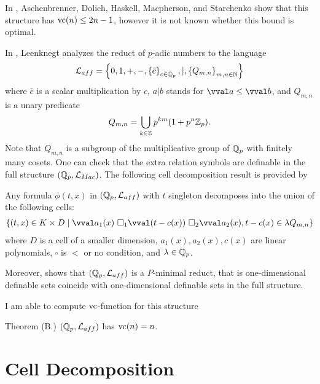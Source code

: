 \documentclass{amsart}
\renewcommand{\LL}{\mathcal L}
\newcommand{\LLM}{\mathcal L_{Mac}}
\newcommand{\curly}[1]{\left\{#1\right\}}
\begin{document}
In \cite{density}, Aschenbrenner, Dolich, Haskell, Macpherson, and Starchenko show that this structure has $\operatorname{vc}(n) \leq 2n - 1$,
however it is not known whether this bound is optimal.

In \cite{reduct}, Leenknegt analyzes the reduct of $p$-adic numbers to the language
\begin{align*}
    \LL_{aff}  = \curly{0, 1, +, -, \curly{\bar c}_{c \in \Q_p}, |, \curly{Q_{m,n}}_{m,n\in \N}}
\end{align*}
where $\bar c$ is a scalar multiplication by $c$,
$a | b$ stands for $\vval a \leq \vval b$,
and $Q_{m,n}$ is a unary predicate
\begin{align*}
    Q_{m,n} = \bigcup_{k \in \mathbb{Z}} p^{km} (1 + p^n\mathbb{Z}_p).
\end{align*}
Note that $Q_{m,n}$ is a subgroup of the multiplicative group of $\mathbb{Q}_p$ with finitely many cosets.
One can check that the extra relation symbols are definable in the full structure $(\Q_p, \LLM)$.
The following cell decomposition result is provided by \cite{reduct}

\begin{Theorem}
    Any formula $\phi(t, x)$ in $(\Q_p, \LL_{aff})$ with $t$ singleton decomposes into the union of the following cells:
    \begin{align*}
            \curly{(t, x) \in K \times D \mid \vval a_1(x) \ \square_1 \vval (t - c(x)) \ \square_2 \vval a_2(x), t - c(x) \in \lambda Q_{m,n} }
    \end{align*}
    where $D$ is a cell of a smaller dimension,
    $a_1(x), a_2(x), c(x)$ are linear polynomials,
    $\square$ is $<$ or no condition, and
    $\lambda  \in\mathbb{Q}_p$.
\end{Theorem}  

Moreover, \cite{reduct} shows that $(\Q_p, \LL_{aff})$ is a $P$-minimal reduct,
that is one-dimensional definable sets coincide with one-dimensional definable sets in the full structure.

I am able to compute $\operatorname{vc}$-function for this structure
\begin{Theorem} {Theorem (B.)}
    $(\Q_p, \LL_{aff})$ has $\operatorname{vc}(n) = n$.
\end{Theorem}




\section{Cell Decomposition}
\end{document}
